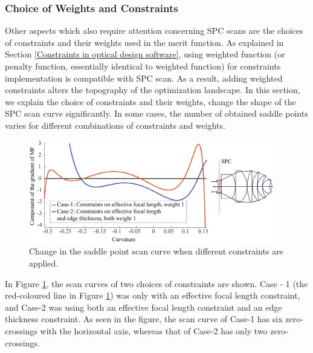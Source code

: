 \subsubsection{Choice of Weights and Constraints}
Other aspects which also require attention concerning SPC scans are the choices of constraints and their weights used in the merit function. As explained in Section \ref{Constraints in optical design software}, using weighted function (or penalty function, essentially identical to weighted function) for constraints implementation is compatible with SPC scan. As a result, adding weighted constraints alters the topography of the optimization landscape.  In this section, we explain the choice of constraints and their weights, change the shape of the SPC scan curve significantly. In some cases, the number of obtained saddle points varies for different combinations of constraints and weights. 

\begin{figure}[h!]
    \centering
    \setlength{\abovecaptionskip}{5pt}
    \setlength{\belowcaptionskip}{-4pt}
    \includegraphics[width=0.95\textwidth]{chapter-4/figures/Vollrath_ConstraintDif.png}
    \caption{Change in the saddle point scan curve when different constraints are applied.}
    \label{fig: vollrath_consdif}
\end{figure}

In Figure \ref{fig: vollrath_consdif}, the scan curves of two choices of constraints are shown. Case - 1 (the red-coloured line in Figure \ref{fig: vollrath_consdif}) was only with an effective focal length constraint, and Case-2 was using both an effective focal length constraint and an edge thickness constraint. As seen in the figure, the scan curve of Case-1 has six zero-crossings with the horizontal axis, whereas that of Case-2 has only two zero-crossings. 

